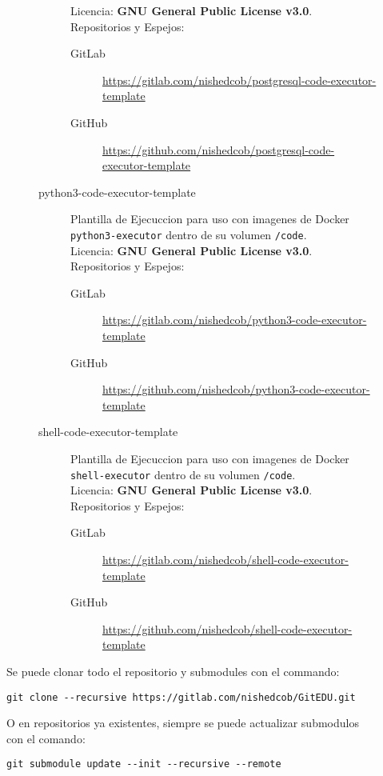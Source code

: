 \begin{description}
\begin{description}
\begin{description}
            Licencia: \textbf{GNU General Public License v3.0}. \\
            Repositorios y Espejos:
            \begin{description}
            	\item[GitLab] \sloppy \url{https://gitlab.com/nishedcob/postgresql-code-executor-template}
                \item[GitHub] \sloppy \url{https://github.com/nishedcob/postgresql-code-executor-template}
            \end{description}
        	\item[python3-code-executor-template] Plantilla de Ejecuccion para uso con imagenes de Docker \texttt{python3-executor} dentro de su volumen \texttt{/code}.\\
            Licencia: \textbf{GNU General Public License v3.0}. \\
            Repositorios y Espejos:
            \begin{description}
            	\item[GitLab] \sloppy \url{https://gitlab.com/nishedcob/python3-code-executor-template}
                \item[GitHub] \sloppy \url{https://github.com/nishedcob/python3-code-executor-template}
            \end{description}
        	\item[shell-code-executor-template] Plantilla de Ejecuccion para uso con imagenes de Docker \texttt{shell-executor} dentro de su volumen \texttt{/code}.\\
            Licencia: \textbf{GNU General Public License v3.0}. \\
            Repositorios y Espejos:
            \begin{description}
            	\item[GitLab] \sloppy \url{https://gitlab.com/nishedcob/shell-code-executor-template}
                \item[GitHub] \sloppy \url{https://github.com/nishedcob/shell-code-executor-template}
            \end{description}
        \end{description}
    \end{description}
    Se puede clonar todo el repositorio y submodules con el commando:
    \begin{lstlisting}[breaklines]
git clone --recursive https://gitlab.com/nishedcob/GitEDU.git
    \end{lstlisting}
    O en repositorios ya existentes, siempre se puede actualizar submodulos con el comando:
    \begin{lstlisting}
git submodule update --init --recursive --remote
    \end{lstlisting}
\end{description}
